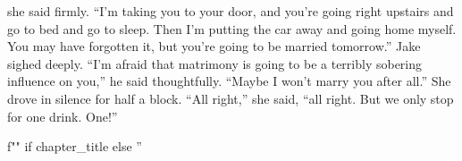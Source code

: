 \documentclass{novel}
\begin{document}
she said firmly. “I'm taking you to your door, and you’re going right upstairs and go to bed and go to sleep. Then I’m putting the car away and going home myself. You may have forgotten it, but you’re going to be married tomorrow.” Jake sighed deeply. “I’m afraid that matrimony is going to be a terribly sobering influence on you,” he said thoughtfully. “Maybe I won’t marry you after all.” She drove in silence for half a block. “All right,” she said, “all right. But we only stop for one drink. One!”

\begin{ChapterStart}
\vspace{3\nbs}
f"" if chapter_title else ''
\end{ChapterStart}
\end{document}

